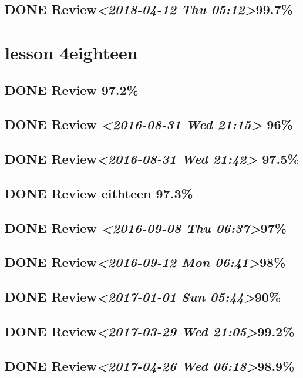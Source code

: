 \documentclass[11pt]{ctexart}
\begin{document}
\subsection{{\bfseries\sffamily DONE} Review\textit{<2018-04-12 Thu 05:12>}99.7\%}
\label{sec:org78f0733}
\section{lesson 4eighteen}
\label{sec:org1ca378a}
\subsection{{\bfseries\sffamily DONE} Review 97.2\%}
\label{sec:org755f373}
\subsection{{\bfseries\sffamily DONE} Review \textit{<2016-08-31 Wed 21:15> } 96\%}
\label{sec:orge788574}
\subsection{{\bfseries\sffamily DONE} Review\textit{<2016-08-31 Wed 21:42> } 97.5\%}
\label{sec:orgd2fa6ae}
\subsection{{\bfseries\sffamily DONE} Review eithteen 97.3\%}
\label{sec:org3ccb489}

\subsection{{\bfseries\sffamily DONE} Review \textit{<2016-09-08 Thu 06:37>}97\%}
\label{sec:org5a82a37}
\subsection{{\bfseries\sffamily DONE} Review\textit{<2016-09-12 Mon 06:41>}98\%}
\label{sec:org135e11e}
\subsection{{\bfseries\sffamily DONE} Review\textit{<2017-01-01 Sun 05:44>}90\%}
\label{sec:org411e903}
\subsection{{\bfseries\sffamily DONE} Review\textit{<2017-03-29 Wed 21:05>}99.2\%}
\label{sec:org381a135}
\subsection{{\bfseries\sffamily DONE} Review\textit{<2017-04-26 Wed 06:18>}98.9\%}
\label{sec:org35a2bf7}
\end{document}
